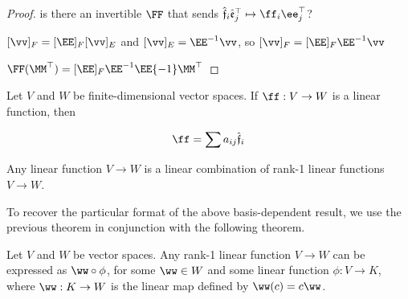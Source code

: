 \begin{proof}
    is there an invertible $\FF$ that sends $\sff_i \see_j^\top \mapsto \ff_i \ee_j^\top$?
    
    $[\vv]_F = [\EE]_F [\vv]_E$ and $[\vv]_E = \EE^{-1} \vv$, so $[\vv]_F = [\EE]_F \EE^{-1} \vv$

    $\FF(\MM^\top) = [\EE]_F \EE^{-1} \EE{-1} \MM^\top$
\end{proof}

\begin{theorem}
    Let $V$ and $W$ be finite-dimensional vector spaces. If $\ff:V \rightarrow W$ is a linear function, then

    \begin{align*}
        \ff = \sum a_{ij} \sff_i
    \end{align*}
\end{theorem}

\begin{theorem}
    Any linear function $V \rightarrow W$ is a linear combination of rank-1 linear functions $V \rightarrow W$.
\end{theorem}

To recover the particular format of the above basis-dependent result, we use the previous theorem in conjunction with the following theorem.

\begin{theorem}
    Let $V$ and $W$ be vector spaces. Any rank-1 linear function $V \rightarrow W$ can be expressed as $\ww \circ \phi$, for some $\ww \in W$ and some linear function $\phi:V \rightarrow K$, where $\ww:K \rightarrow W$ is the linear map defined by $\ww(c) = c \ww$.
\end{theorem}

